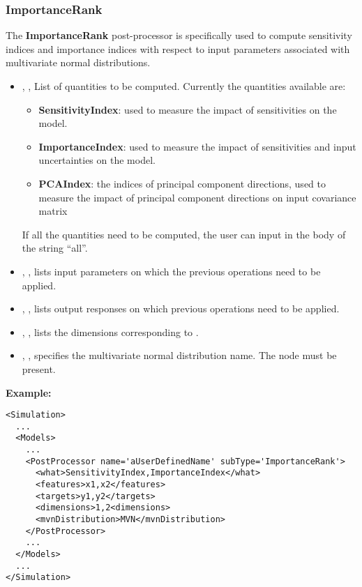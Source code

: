 \subsubsection{ImportanceRank}
\label{ImportanceRank}
The \textbf{ImportanceRank} post-processor is specifically used
to compute sensitivity indices and importance indices with respect to input parameters
associated with multivariate normal distributions.
%
%
\begin{itemize}
  \item {}, ,
  List of quantities to be computed.
  Currently the quantities available are:
  \begin{itemize}
    \item \textbf{SensitivityIndex}: used to measure the impact of sensitivities on the model.
    \item \textbf{ImportanceIndex}: used to measure the impact of sensitivities and input uncertainties on the model.
    \item \textbf{PCAIndex}: the indices of principal component directions, used to measure the impact
    of principal component directions on input covariance matrix
  \end{itemize}
  If all the quantities need to be computed, the user can input in the body of
   the string ``all''.
  \item {}, ,
  lists input parameters on which the previous operations need to be applied.
  \item {}, ,
  lists output responses on which previous operations need to be applied.
  \item {}, ,
  lists the dimensions corresponding to .
  \item {}, , specifies the
  multivariate normal distribution name. The  node must be present.
\end{itemize}
\textbf{Example:}
\begin{lstlisting}[style=XML,morekeywords={name,subType,debug}]
<Simulation>
  ...
  <Models>
    ...
    <PostProcessor name='aUserDefinedName' subType='ImportanceRank'>
      <what>SensitivityIndex,ImportanceIndex</what>
      <features>x1,x2</features>
      <targets>y1,y2</targets>
      <dimensions>1,2<dimensions>
      <mvnDistribution>MVN</mvnDistribution>
    </PostProcessor>
    ...
  </Models>
  ...
</Simulation>
\end{lstlisting}

